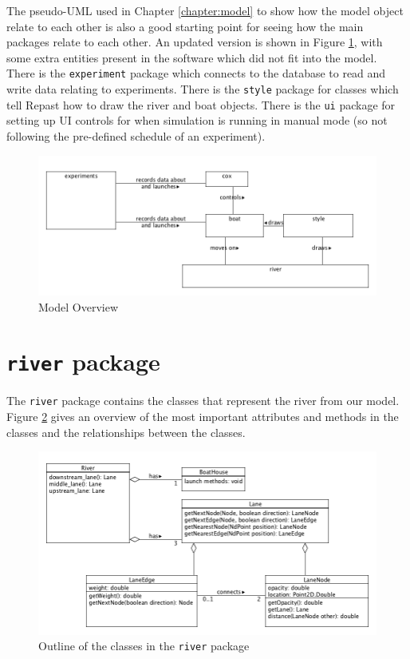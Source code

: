 The pseudo-UML used in Chapter \ref{chapter:model} to show how the model object relate to each other is also a
good starting point for seeing how the main packages relate to each
other. An updated version is shown in Figure \ref{software:fig:modeloverview}, with some extra entities present in the software which did not fit into the model. There
is the \texttt{experiment} package which connects to the database to read and write data relating to experiments. There is the \texttt{style} package for classes which tell Repast how to draw the river and boat
objects. There is the \texttt{ui} package for setting up UI controls for when
simulation is running in manual mode (so not following the
pre-defined schedule of an experiment).

\begin{figure}
\begin{center}
  \includegraphics[scale=0.5]{images/packages.png}
  \caption{Model Overview}
  \label{software:fig:modeloverview}
\end{center}
\end{figure}



\section{\texttt{river} package}
The \texttt{river} package contains the classes that represent the river from our model. Figure \ref{software:fig:riverUML} gives an overview of the most important attributes and methods in the classes and the relationships between the classes.

\begin{figure}
\begin{center}
  \includegraphics[scale=0.5]{images/riverpackage.png}
  \caption{Outline of the classes in the \texttt{river} package}
  \label{software:fig:riverUML}
\end{center}
\end{figure}

